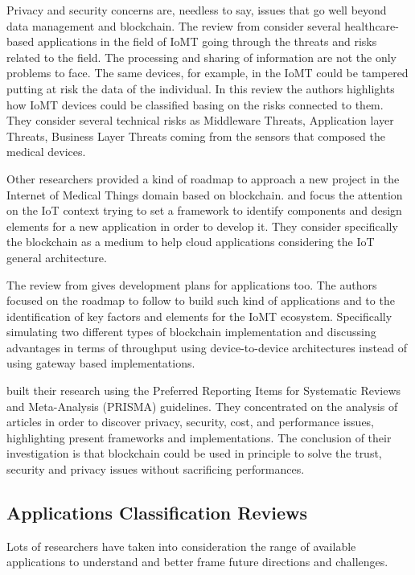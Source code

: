 \documentclass[preprint]{elsarticle}
\begin{document}
Privacy and security concerns are, needless to say, issues that go well beyond data management and blockchain. 
The review from \citet{nanayakkara2019security} consider several healthcare-based applications in the field of IoMT going through the threats and risks related to the field. The processing and sharing of information are not the only problems to face. The same devices, for example, in the IoMT could be tampered putting at risk the data of the individual. In this review the authors highlights how IoMT devices could be classified basing on the risks connected to them. They consider several technical risks as Middleware Threats, Application layer Threats, Business Layer Threats coming from the sensors that composed the medical devices.

Other researchers provided a kind of roadmap to approach a new project in the Internet of Medical Things domain based on blockchain. \citet{fernandez2018review} and \citet{al2020intelligence} focus the attention on the IoT context trying to set a framework to identify components and design elements for a new application in order to develop it. They consider specifically the blockchain as a medium to help cloud applications considering the IoT general architecture.

The review from \citet{pavithran2020towards} gives development plans for applications too. The authors focused on the roadmap to follow to build such kind of applications and to the identification of key factors and elements for the IoMT ecosystem. 
Specifically simulating two different types of blockchain implementation and discussing advantages in terms of throughput using device-to-device architectures instead of using gateway based implementations.

\citet{chukwu2020systematic} built their research using the Preferred Reporting Items for Systematic Reviews and Meta-Analysis (PRISMA) guidelines. They concentrated on the analysis of articles in order to discover privacy, security, cost, and performance issues, highlighting present frameworks and implementations. The conclusion of their investigation is that blockchain could be used in principle to solve the trust, security and privacy issues without sacrificing performances.

\subsection{Applications Classification Reviews}
Lots of researchers have taken into consideration the range of available applications to understand and better frame future directions and challenges.
\end{document}
